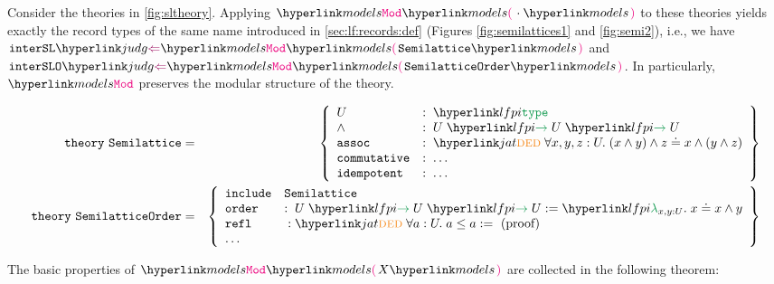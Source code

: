 \begin{example}\label{ex:mod}
  Consider the theories in \autoref{fig:sltheory}. Applying
  $\modelsof\cdot$ to these theories yields exactly the record types of the same name introduced in \autoref{sec:lf:records:def} (Figures \ref{fig:semilattices1} and \ref{fig:semi2}), i.e., we have $\hastype{\csl}{\modelsof{\SL}}$ and $\hastype{\cslo}{\modelsof{\SLO}}$.
  In particularly, $\modelsofF$ preserves the modular structure of the theory.
  
\begin{framed}\footnotesize
  \begin{eqnarray*}
\mathtt{theory\ Semilattice}  & =&  \left\{
  \begin{array}{ll}
	U &:\; \type \\
	\wedge &:\; \lfarrow U{\lfarrow UU} \\
	\mathtt{assoc} &:\; \ded \forall x,y,z:U.\; (x \wedge y) \wedge z \doteq x \wedge (y \wedge z) \\
	\mathtt{commutative} &:\;\ldots \\
	\mathtt{idempotent} &:\;\ldots \\
    \end{array}
    \right\}\\
    \mathtt{theory\ SemilatticeOrder} & = & \left\{
  \begin{array}{ll}
	\mathtt{include} &\mathtt{Semilattice} \\
	\mathtt{order} &:\; \lfarrow U{\lfarrow UU} := \lflambda{x,y:U}{x \doteq x\wedge y}\\
	\mathtt{refl} &\;: \ded \forall a:U.\; a \leq a := \text{ (proof)}\\
	\ldots
  \end{array}
  \right\}
  \end{eqnarray*}
\end{framed}%
\label{fig:sltheory}%
\end{example}

The basic properties of $\modelsof X$ are collected in the following theorem:

